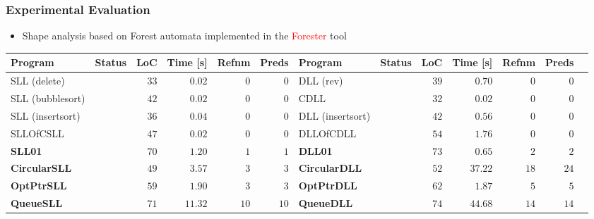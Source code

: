 \documentclass{beamer}
\newcommand{\hlrd}[1]{\textcolor{red}{#1}}
\newcommand{\hcol}[1]{yellow!20!orange!20}
\newcommand{\scol}[1]{blue!40}
\begin{document}
\begin{frame}
\frametitle{Experimental Evaluation}
    \begin{itemize}
        \item Shape analysis based on Forest automata implemented in the \hlrd{Forester} tool
    \end{itemize}
	\begin{center}
	\begin{adjustbox}{max height=\textheight, max width=\textwidth}
	\begin{tabular}{| l | l | r | r | r | r || l | l | r | r | r | r | r |}
        \hline
		Program & Status & LoC & Time [s] & Refnm& Preds & Program & Status & LoC & Time [s] & Refnm & Preds \\
        \hline
        \hline
		SLL (delete) & \cellcolor{\scol{}} \safe & $33$ & $0.02$ &  $0$ & $0$ & DLL (rev) & \cellcolor{\scol{}} \safe & $39$ &  $0.70$ & $0$  & $0$ \\
        \hline
		SLL (bubblesort) & \cellcolor{\scol{}} \safe & $42$ & $0.02$ &  $0$ & $0$ & CDLL & \cellcolor{\scol{}} \safe & $32$ &  $0.02$  & $0$  & $0$ \\
        \hline
		SLL (insertsort) & \cellcolor{\scol{}} \safe & $36$ & $0.04$ & $0$ & $0$ & DLL (insertsort) & \cellcolor{\scol{}} \safe & $42$ &  $0.56$  & $0$  & $0$ \\
        \hline
		SLLOfCSLL & \cellcolor{\scol{}} \safe & $47$ & $0.02$ & $0$ & $0$ & DLLOfCDLL & \cellcolor{\scol{}} \safe & $54$ &  $1.76$  & $0$  & $0$ \\
        \hline
		\rowcolor{\hcol{}}
		\textbf{SLL01}    & \cellcolor{\scol{}} \safe & $70$ & $1.20$   &  $1$ & $1$ & \textbf{DLL01} & \cellcolor{\scol{}} \safe & $73$ &  $0.65$  & $2$  & $2$ \\
        \hline
		\rowcolor{\hcol{}}
		\textbf{CircularSLL} & \cellcolor{\scol{}} \safe & $49$ & $3.57$   &  $3$  & $3$ & \textbf{CircularDLL} & \cellcolor{\scol{}} \safe  & $52$ &  $37.22$ & $18$ & $24$ \\
        \hline
		\rowcolor{\hcol{}}
		\textbf{OptPtrSLL}   & \cellcolor{\scol{}} \safe & $59$ & $1.90$ & $3$ & $3$ & \textbf{OptPtrDLL} &\cellcolor{\scol{}} \safe & $62$ &  $1.87$  & $5$ & $5$ \\
        \hline
		\rowcolor{\hcol{}}
		\textbf{QueueSLL}    & \cellcolor{\scol{}} \safe & $71$ & $11.32$  &  $10$ & $10$ & \textbf{QueueDLL} &  \cellcolor{\scol{}}  \safe  & $74$ &  $44.68$ & $14$ & $14$ \\

\end{tabular}
\end{adjustbox}
\end{center}
\end{frame}
\end{document}
